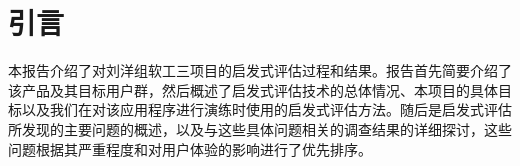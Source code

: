 \section{引言}
本报告介绍了对刘洋组软工三项目的启发式评估过程和结果。报告首先简要介绍了该产品及其目标用户群，然后概述了启发式评估技术的总体情况、本项目的具体目标以及我们在对该应用程序进行演练时使用的启发式评估方法。随后是启发式评估所发现的主要问题的概述，以及与这些具体问题相关的调查结果的详细探讨，这些问题根据其严重程度和对用户体验的影响进行了优先排序。

